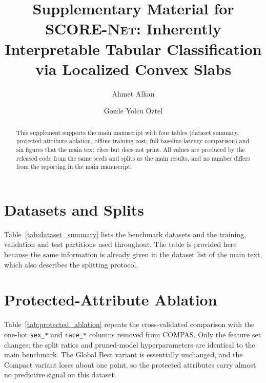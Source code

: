 \documentclass[1p,10pt]{elsarticle}
\newcommand{\modelname}{\textsc{SCORE-Net}}
\begin{document}
\begin{frontmatter}

\title{Supplementary Material for\\ \modelname: Inherently Interpretable
Tabular Classification via Localized Convex Slabs}

\author[a]{Ahmet Alkan}
\author[a]{Gozde Yolcu Oztel}
\address[a]{Department of Software Engineering, Faculty of Computer and
Information Sciences, Sakarya University, Esentepe Campus, 54187 Serdivan,
Sakarya, Turkey}

\begin{abstract}
This supplement supports the main manuscript with four tables (dataset summary,
protected-attribute ablation, offline training cost, full baseline-latency
comparison) and six figures that the main text cites but does not print. All
values are produced by the released code from the same seeds and splits as the
main results, and no number differs from the reporting in the main manuscript.
\end{abstract}

\end{frontmatter}

\suppressfloats[t]


\section{Datasets and Splits}
\label{sec:supp_datasets}

Table~\ref{tab:dataset_summary} lists the benchmark datasets and the training,
validation and test partitions used throughout. The table is provided here
because the same information is already given in the dataset list of the main
text, which also describes the splitting protocol.



\section{Protected-Attribute Ablation}
\label{sec:supp_protected}

Table~\ref{tab:protected_ablation} repeats the cross-validated comparison with
the one-hot \texttt{sex\_*} and \texttt{race\_*} columns removed from COMPAS.
Only the feature set changes; the split ratios and pruned-model hyperparameters
are identical to the main benchmark. The Global Best variant is essentially
unchanged, and the Compact variant loses about one point, so the protected
attributes carry almost no predictive signal on this dataset.
\end{document}
